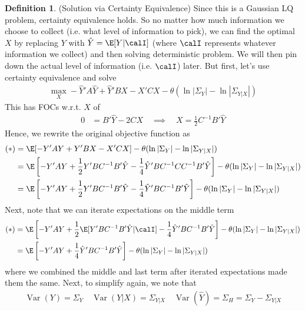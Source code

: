 \documentclass[12pt]{article}
\theoremstyle{plain}
\theoremstyle{definition}
\newtheorem{defn}[thm]{Definition}
\theoremstyle{remark}
\newcommand{\Var}{\operatorname{Var}}
\begin{document}
\clearpage
\begin{defn}(Solution via Certainty Equivalence)
Since this is a Gaussian LQ problem, certainty equivalence holds.
So no matter how much information we choose to collect (i.e. what level
of information to pick), we can find the optimal $X$ by replacing $Y$
with $\hat{Y}=\E[Y|\calI]$ (where $\calI$ represents whatever
information we collect) and then solving deterministic problem.
We will then pin down the actual level of information (i.e. $\calI$)
later. But first, let's use certainty equivalence and solve
\begin{align*}
  \max_{X}
  -\hat{Y}'A\hat{Y} + \hat{Y}'BX - X'CX
  -\theta(\ln |\Sigma_Y|-\ln|\Sigma_{Y|X}|)
\end{align*}
This has FOCs w.r.t. $X$ of
\begin{align*}
  0 &= B'\hat{Y} - 2CX
  \quad\implies\quad
  X =
  \frac{1}{2}C^{-1}B'\hat{Y}
\end{align*}
Hence, we rewrite the original objective function as
\begin{align*}
  (*)
  &=
  \E[-Y'AY + Y'BX - X'CX]
  -\theta(\ln |\Sigma_Y|-\ln|\Sigma_{Y|X}|)
  \\
  &=
  \E\left[
    - Y'AY
    + \frac{1}{2}Y'BC^{-1}B'\hat{Y}
    - \frac{1}{4}\hat{Y}'BC^{-1}CC^{-1}B'\hat{Y}
  \right]
  -\theta(\ln |\Sigma_Y|-\ln|\Sigma_{Y|X}|)
  \\
  &=
  \E\left[
    - Y'AY
    + \frac{1}{2}Y'BC^{-1}B'\hat{Y}
    - \frac{1}{4}\hat{Y}'BC^{-1}B'\hat{Y}
  \right]
  -\theta(\ln |\Sigma_Y|-\ln|\Sigma_{Y|X}|)
\end{align*}
Next, note that we can iterate expectations on the middle term
\begin{align*}
  (*)
  &=
  \E\left[
    - Y'AY
    + \frac{1}{2}\E[Y'BC^{-1}B'\hat{Y}|\calI]
    - \frac{1}{4}\hat{Y}'BC^{-1}B'\hat{Y}
  \right]
  -\theta(\ln |\Sigma_Y|-\ln|\Sigma_{Y|X}|)
  \\
  &=
  \E\left[
    - Y'AY
    + \frac{1}{4}\hat{Y}'BC^{-1}B'\hat{Y}
  \right]
  -\theta(\ln |\Sigma_Y|-\ln|\Sigma_{Y|X}|)
\end{align*}
where we combined the middle and last term after iterated expectations
made them the same. Next, to simplify again, we note that
\begin{align*}
  \Var(Y)
  = \Sigma_Y
  \quad
  \Var(Y|X)
  = \Sigma_{Y|X}
  \quad
  \Var(\hat{Y})
  = \Sigma_H
  = \Sigma_Y-\Sigma_{Y|X}
\end{align*}

\end{defn}
\end{document}
